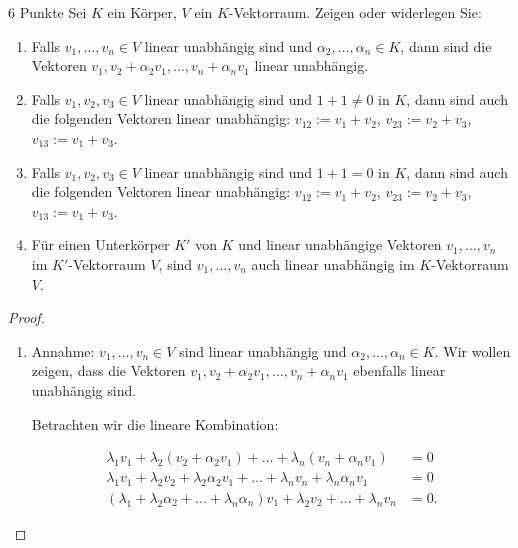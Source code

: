 \documentclass{problemset}
\begin{document}
\begin{problem}{6 Punkte}
Sei $K$ ein Körper, $V$ ein $K$-Vektorraum. Zeigen oder widerlegen Sie:
\begin{enumerate}
    \item Falls $v_1, \ldots, v_n \in V$ linear unabhängig sind und $\alpha_2,
          \ldots, \alpha_n \in K$, dann sind die Vektoren $v_1, v_2 +
          \alpha_2v_1, \ldots, v_n + \alpha_nv_1$ linear unabhängig.
    \item Falls $v_1, v_2, v_3 \in V$ linear unabhängig sind und $1 + 1 \neq 0$
          in $K$, dann sind auch die folgenden Vektoren linear unabhängig:
          $v_{12} := v_1 + v_2$, $v_{23} := v_2 + v_3$, $v_{13} := v_1 + v_3$.
    \item Falls $v_1, v_2, v_3 \in V$ linear unabhängig sind und $1 + 1 = 0$ in
          $K$, dann sind auch die folgenden Vektoren linear unabhängig: $v_{12}
          := v_1 + v_2$, $v_{23} := v_2 + v_3$, $v_{13} := v_1 + v_3$.
    \item Für einen Unterkörper $K'$ von $K$ und linear unabhängige Vektoren
          $v_1, \ldots, v_n$ im $K'$-Vektorraum $V$, sind $v_1, \ldots, v_n$
          auch linear unabhängig im $K$-Vektorraum $V$.
\end{enumerate}
\begin{proof}
    $ $

    \begin{enumerate}
        \item Annahme: $v_1, \ldots, v_n \in V$ sind linear unabhängig und
              $\alpha_2, \ldots, \alpha_n \in K$. Wir wollen zeigen, dass die
              Vektoren $v_1, v_2 + \alpha_2v_1, \ldots, v_n + \alpha_nv_1$
              ebenfalls linear unabhängig sind.

              Betrachten wir die lineare Kombination:

              \begin{align*}
                  \lambda_1 v_1 + \lambda_2 (v_2 + \alpha_2 v_1) + \ldots + \lambda_n (v_n + \alpha_n v_1)               & = 0  \\
                  \lambda_1 v_1 + \lambda_2v_2 + \lambda_2\alpha_2v_1 + \ldots + \lambda_nv_n + \lambda_n\alpha_nv_1     & = 0  \\
                  (\lambda_1 + \lambda_2\alpha_2 + \ldots + \lambda_n\alpha_n)v_1 + \lambda_2v_2 + \ldots + \lambda_nv_n & = 0.
              \end{align*}


\end{enumerate}
\end{proof}
\end{problem}
\end{document}
